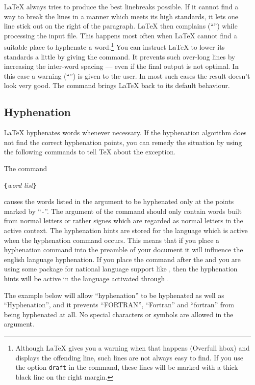 \LaTeX{} always tries to produce the best linebreaks possible. If it
cannot find a way to break the lines in a manner which meets its high
standards, it lets one line stick out on the right of the paragraph.
\LaTeX{} then complains (``'') while processing the
input file. This happens most often when \LaTeX{} cannot find a
suitable place to hyphenate a word.\footnote{Although \LaTeX{} gives
  you a warning when that happens (Overfull hbox) and displays the
  offending line, such lines are not always easy to find. If you use
  the option \texttt{draft} in the  command, these
  lines will be marked with a thick black line on the right margin.}
You can instruct \LaTeX{} to lower its standards a little by giving
the  command. It prevents such over-long lines by
increasing the inter-word spacing --- even if the final output is not
optimal.  In this case a warning (``'') is given to
the user.  In most such cases the result doesn't look very good. The
command  brings \LaTeX{} back to its default behaviour.

\subsection{Hyphenation} \label{hyph}

\LaTeX{} hyphenates words whenever necessary. If the hyphenation
algorithm does not find the correct hyphenation points, you can
remedy the situation by using the following commands to tell \TeX{}
about the exception.

The command
\begin{lscommand}
\verb|{|\emph{word list}\verb|}|
\end{lscommand}
\noindent causes the words listed in the argument to be hyphenated only at
the points marked by ``\verb|-|''.  The argument of the command should only
contain words built from normal letters or rather signes which are regarded
as normal letters in the active context. The hyphenation hints are
stored for the language which is active when the hyphenation command
occurs. This means that if you place a hyphenation command into the preamble
of your document it will influence the english language hyphenation. If you
place the command after the \verb|| and you are using some
package for national language support like , then the hyphenation
hints will be active in the language activated through .

The example below will allow ``hyphenation'' to be hyphenated as well as
``Hyphenation'', and it prevents ``FORTRAN'', ``Fortran'' and ``fortran''
from being hyphenated at all.  No special characters or symbols are allowed
in the argument.

